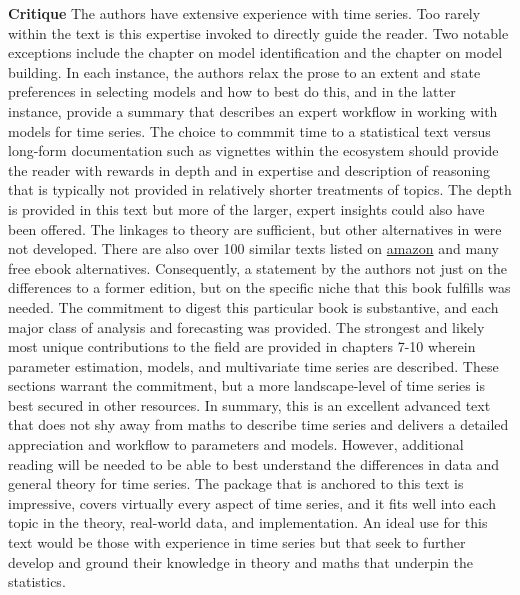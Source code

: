 \documentclass[bookreview]{jss}
\begin{document}
\textbf{Critique} \newline
The authors have extensive experience with time series. Too rarely within the text is this expertise invoked to directly guide the reader. Two notable exceptions include the chapter on model identification and the chapter on model building. In each instance, the authors relax the prose to an extent and state preferences in selecting models and how to best do this, and in the latter instance, provide a summary that describes an expert workflow in working with models for time series. The choice to commmit time to a statistical text versus long-form documentation such as vignettes within the  ecosystem should provide the reader with rewards in depth and in expertise and description of reasoning that is typically not provided in relatively shorter treatments of topics. The depth is provided in this text but more of the larger, expert insights could also have been offered. The linkages to theory are sufficient, but other alternatives in  were not developed. There are also over 100 similar texts listed on \href{https://amazon.com}{amazon} and many free ebook alternatives. Consequently, a statement by the authors not just on the differences to a former edition, but on the specific niche that this book fulfills was needed. The commitment to digest this particular book is substantive, and each major class of analysis and forecasting was provided. The strongest and likely most unique contributions to the field are provided in chapters 7-10 wherein parameter estimation, models, and multivariate time series are described. These sections warrant the commitment, but a more landscape-level of time series is best secured in other resources. In summary, this is an excellent advanced text that does not shy away from maths to describe time series and delivers a detailed appreciation and workflow to parameters and models. However, additional reading will be needed to be able to best understand the differences in data and general theory for time series. The  package  that is anchored to this text is impressive, covers virtually every aspect of time series, and it fits well into each topic in the theory, real-world data, and implementation. An ideal use for this text would be those with experience in time series but that seek to further develop and ground their knowledge in theory and maths that underpin the statistics.


\end{document}
